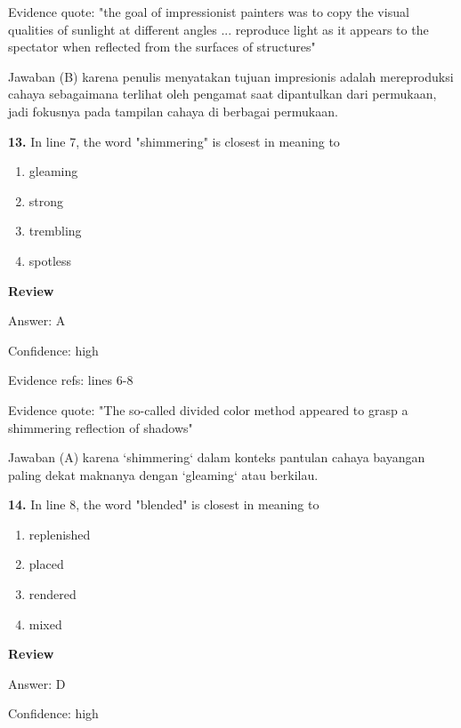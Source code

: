 \documentclass[12pt]{article}
\begin{document}
Evidence quote: "the goal of impressionist painters was to copy the visual qualities of sunlight at different angles ... reproduce light as it appears to the spectator when reflected from the surfaces of structures"\par
Jawaban (B) karena penulis menyatakan tujuan impresionis adalah mereproduksi cahaya sebagaimana terlihat oleh pengamat saat dipantulkan dari permukaan, jadi fokusnya pada tampilan cahaya di berbagai permukaan.\par
\endgroup
\par
\vspace{0.25\baselineskip}
\noindent\textbf{13.} In line 7, the word "shimmering" is closest in meaning to
\begin{enumerate}[label=(\Alph*),leftmargin=*,itemsep=0.2em]
\item gleaming
\item strong
\item trembling
\item spotless
\end{enumerate}
\par
\begingroup
\setlength{\parskip}{0pt}
\setlength{\parindent}{0pt}
\textbf{Review}\par
Answer: A\par
Confidence: high\par
Evidence refs: lines 6-8\par
Evidence quote: "The so-called divided color method appeared to grasp a shimmering reflection of shadows"\par
Jawaban (A) karena `shimmering` dalam konteks pantulan cahaya bayangan paling dekat maknanya dengan `gleaming` atau berkilau.\par
\endgroup
\par
\vspace{0.25\baselineskip}
\noindent\textbf{14.} In line 8, the word "blended" is closest in meaning to
\begin{enumerate}[label=(\Alph*),leftmargin=*,itemsep=0.2em]
\item replenished
\item placed
\item rendered
\item mixed
\end{enumerate}
\par
\begingroup
\setlength{\parskip}{0pt}
\setlength{\parindent}{0pt}
\textbf{Review}\par
Answer: D\par
Confidence: high\par
\end{document}
